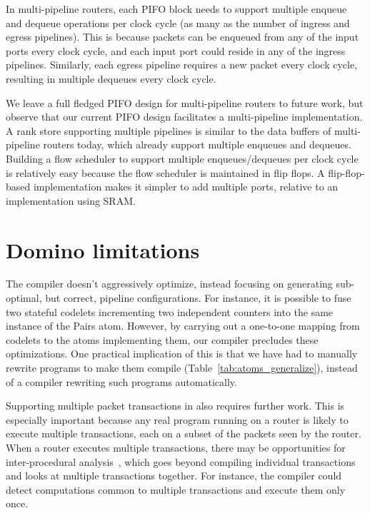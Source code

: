 In multi-pipeline routers, each PIFO block needs to support multiple enqueue
and dequeue operations per clock cycle (as many as the number of ingress and
egress pipelines). This is because packets can be enqueued from any of the
input ports every clock cycle, and each input port could reside in any of the
ingress pipelines. Similarly, each egress pipeline requires a new packet every
clock cycle, resulting in multiple dequeues every clock cycle.

We leave a full fledged PIFO design for multi-pipeline routers to future work,
but observe that our current PIFO design facilitates a multi-pipeline
implementation.  A rank store supporting multiple pipelines is similar to the
data buffers of multi-pipeline routers today, which already support multiple
enqueues and dequeues. Building a flow scheduler to support multiple
enqueues/dequeues per clock cycle is relatively easy because the flow scheduler
is maintained in flip flops. A flip-flop-based implementation makes it simpler
to add multiple ports, relative to an implementation using SRAM.

\section{Domino limitations}
\label{sec:domino_limitations}
The \pktlanguage compiler doesn't aggressively optimize, instead focusing on
generating sub-optimal, but correct, pipeline configurations. For instance, it
is possible to fuse two stateful codelets incrementing two independent counters
into the same instance of the Pairs atom. However, by carrying out a one-to-one
mapping from codelets to the atoms implementing them, our compiler precludes
these optimizations. One practical implication of this is that we have had to
manually rewrite programs to make them compile
(Table~\ref{tab:atoms_generalize}), instead of a compiler rewriting such
programs automatically.

Supporting multiple packet transactions in \pktlanguage also requires further
work. This is especially important because any real program running on a router
is likely to execute multiple transactions, each on a subset of the packets
seen by the router. When a router executes multiple transactions, there may be
opportunities for inter-procedural analysis~\cite{dragonbook}, which goes
beyond compiling individual transactions and looks at multiple transactions
together.  For instance, the compiler could detect computations common to
multiple transactions and execute them only once.

